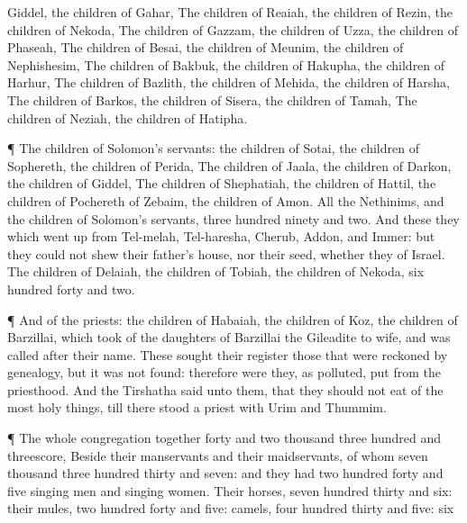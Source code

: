{Giddel, the
children of
Gahar,
The
children of
Reaiah, the
children of
Rezin, the
children of
Nekoda,
The
children of
Gazzam, the
children of
Uzza, the
children of
Phaseah,
The
children of
Besai, the
children of
Meunim, the
children of
Nephishesim,
The
children of
Bakbuk, the
children of
Hakupha, the
children of
Harhur,
The
children of
Bazlith, the
children of
Mehida, the
children of
Harsha,
The
children of
Barkos, the
children of
Sisera, the
children of
Tamah,
The
children of
Neziah, the
children of
Hatipha.
\par }{\PP {}¶ The
children of
Solomon’s
servants: the
children of
Sotai, the
children of
Sophereth, the
children of
Perida,
The
children of
Jaala, the
children of
Darkon, the
children of
Giddel,
The
children of
Shephatiah, the
children of
Hattil, the
children of Pochereth of
Zebaim, the
children of
Amon.
All the
Nethinims, and the
children of
Solomon’s
servants,
{}
three
hundred
ninety and
two.
And these
{} they which went
up
{} from
Tel-melah,
Tel-haresha,
Cherub,
Addon, and
Immer: but they
could not
shew their
father’s
house, nor their
seed, whether they
{} of
Israel.
The
children of
Delaiah, the
children of
Tobiah, the
children of
Nekoda,
six
hundred
forty and
two.
\par }{\PP {}¶ And of the
priests: the
children of
Habaiah, the
children of
Koz, the
children of
Barzillai, which
took
{} of the
daughters of
Barzillai the
Gileadite to
wife, and was
called after their
name.
These
sought their
register
{} those that were reckoned by
genealogy, but it was not
found: therefore were they, as
polluted, put from the
priesthood.
And the
Tirshatha
said unto them, that they should not
eat of the
most holy
things, till there
stood
{} a
priest with
Urim and
Thummim.
\par }{\PP {}¶ The whole
congregation
together
{}
forty and two
thousand
three
hundred and
threescore,
Beside their
manservants and their
maidservants, of whom
{}
seven
thousand
three
hundred
thirty and
seven: and they had two
hundred
forty and
five singing
men and singing
women.
Their
horses,
seven
hundred
thirty and
six: their
mules, two
hundred
forty and
five:
camels,
four
hundred
thirty and
five:
six
}
